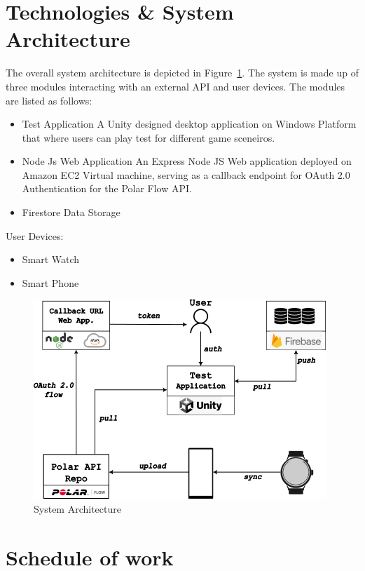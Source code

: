 \documentclass{report}
\begin{document}
    \section*{Technologies \& System Architecture}

        The overall system architecture is depicted in Figure~\ref{fig:architecture}. The system is made up of three modules 
        interacting with an external API and user devices. The modules are listed as follows:
        \begin{itemize}
            \item{Test Application} A Unity designed desktop application on Windows Platform that where users can play test 
                for different game sceneiros.
            \item {Node Js Web Application}
                An Express Node JS Web application deployed on Amazon EC2 Virtual machine, serving as a callback endpoint for 
                OAuth 2.0 Authentication for the Polar Flow API. 
            \item {Firestore Data Storage}
        \end{itemize}
        User Devices:
        \begin{itemize}
            \item{Smart Watch}
            \item {Smart Phone}
        \end{itemize}
        \begin{figure}[h]
        \includegraphics{images/architecture.png}
        \caption{System Architecture}
        \label{fig:architecture}
        \centering
        \end{figure}

    
    \section*{Schedule of work}
    \printbibliography
\end{document}
